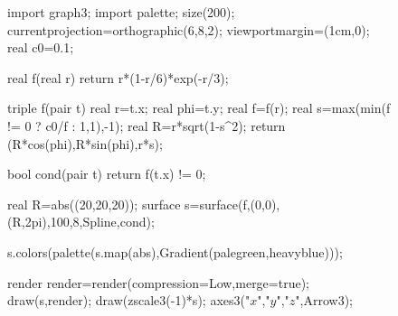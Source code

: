 \begin{figure}[h]
import graph3;
import palette;
size(200);
currentprojection=orthographic(6,8,2);
viewportmargin=(1cm,0);
real c0=0.1;

real f(real r) {return r*(1-r/6)*exp(-r/3);}

triple f(pair t) {
  real r=t.x;
  real phi=t.y;
  real f=f(r);
  real s=max(min(f != 0 ? c0/f : 1,1),-1);
  real R=r*sqrt(1-s^2);
  return (R*cos(phi),R*sin(phi),r*s);
}

bool cond(pair t) {return f(t.x) != 0;}

real R=abs((20,20,20));
surface s=surface(f,(0,0),(R,2pi),100,8,Spline,cond);

s.colors(palette(s.map(abs),Gradient(palegreen,heavyblue)));

render render=render(compression=Low,merge=true);
draw(s,render);
draw(zscale3(-1)*s);
axes3("$x$","$y$","$z$",Arrow3);
\end{figure}
